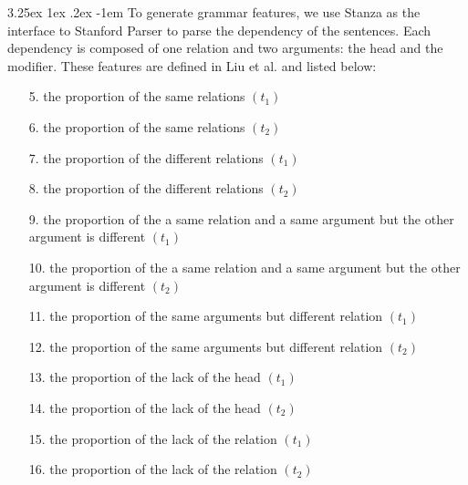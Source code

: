 \documentclass[12pt]{article}
\makeatletter
\newcounter{subsubsubsection}[subsubsection]
\renewcommand\paragraph{\@startsection{paragraph}{5}{\z@}%
  {3.25ex \@plus1ex \@minus.2ex}%
  {-1em}%
  {\normalfont\normalsize\bfseries}}
\makeatother
\begin{document}
\begin{CJK*}{UTF8}{bkai}
\begin{spacing}{1.77}
\paragraph{}
To generate grammar features, we use Stanza\cite{qi2020stanza} as the interface to Stanford Parser to parse the dependency of the sentences. Each dependency is composed of one relation and two arguments: the head and the modifier. These features are defined in Liu et al.\cite{liu_2016_paper} and listed below:

\begin{enumerate}
    \item[ 5.] the proportion of the same relations $(t_1)$
    \item[ 6.] the proportion of the same relations $(t_2)$
    \item[ 7.] the proportion of the different relations $(t_1)$
    \item[ 8.] the proportion of the different relations $(t_2)$
    \item[ 9.] the proportion of the a same relation and a same argument but the other argument is different $(t_1)$
    \item[10.] the proportion of the a same relation and a same argument but the other argument is different $(t_2)$
    \item[11.] the proportion of the same arguments but different relation $(t_1)$
    \item[12.] the proportion of the same arguments but different relation $(t_2)$
    \item[13.] the proportion of the lack of the head $(t_1)$
    \item[14.] the proportion of the lack of the head $(t_2)$
    \item[15.] the proportion of the lack of the relation $(t_1)$
    \item[16.] the proportion of the lack of the relation $(t_2)$
\end{enumerate}



\end{spacing}
\end{CJK*}
\end{document}
